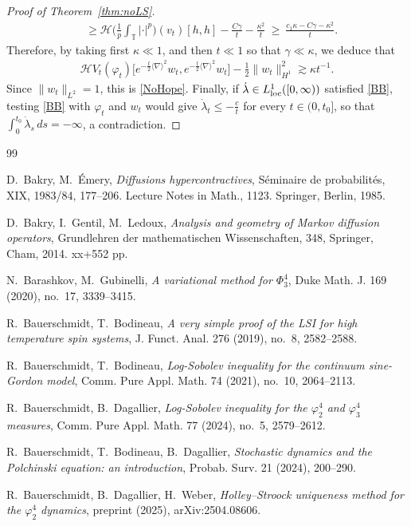 \documentclass[letterpaper, 11pt,  reqno]{amsart}
\theoremstyle{definition}
\newcommand{\1}{\mathbbm 1}
\newcommand{\T}{\mathbb{T}}
\renewcommand{\H}{\mathcal H}
\newcommand{\0}{\mathbf 0}
\newcommand{\nb}{\nabla}
\newcommand{\g}{\gamma}
\newcommand{\ld}{\lambda}
\newcommand{\jb}[1]
{\langle #1 \rangle}
\newcommand{\ph}{\varphi}
\renewcommand{\H}{\mathcal{H}}
\numberwithin{equation}{section}
\numberwithin{theorem}{section}
\newcommand{\HF}[2]{\mathcal H\big(\tfrac1p{\textstyle\int_\T}|\cdot|^p\big)(#1)[#2]}
\begin{document}
\begin{proof}[Proof of Theorem~\ref{thm:noLS}]
\begin{align*}
&\ge\HF{v_t}{h,h}-\frac{C\g}t-\frac{\kappa^2}t
\ \ge\ \frac{c_1\kappa-C\g-\kappa^2}t .
\end{align*}
Therefore, by taking first $\kappa\ll1$, and then $t\ll1$ so that $\g\ll\kappa$, we deduce that
\begin{align*}
    \H V_t(\ph_t)\big[e^{-\frac t2\jb\nb^2}w_t,e^{-\frac t2\jb\nb^2}w_t\big]
- \frac12\|w_t\|_{H^1}^2 \gtrsim \kappa t^{-1}.
\end{align*}
Since $\|w_t\|_{L^2}=1$, this is \eqref{NoHope}. Finally, if $\dot\ld\in L^1_{\rm loc}([0,\infty))$ satisfied \eqref{BB},
testing \eqref{BB} with $\ph_t$ and $w_t$ would give $\dot\ld_t\le-\frac ct$ for every $t\in(0,t_0]$, so that
$\int_0^{t_0}\dot\ld_s\,ds=-\infty$, a contradiction.
\end{proof}
 
\begin{thebibliography}{99}
 
D.~Bakry, M.~\'Emery,
{\it Diffusions hypercontractives}, 
S\'eminaire de probabilit\'es, XIX, 1983/84, 177--206.
Lecture Notes in Math., 1123. Springer, Berlin, 1985.
 
D.~Bakry, I.~Gentil, M.~Ledoux, 
{\it Analysis and geometry of Markov diffusion operators}, Grundlehren der mathematischen Wissenschaften, 348, Springer, Cham, 2014. xx+552 pp.
 
N.~Barashkov, M.~Gubinelli,
{\it  A variational method for $\Phi^4_3$}, 
Duke Math. J. 169 (2020), no.~17, 3339--3415.
 
R.~Bauerschmidt, T.~Bodineau, 
{\it A very simple proof of the LSI for high temperature spin systems}, J. Funct. Anal. 
276 (2019), no.~8, 2582--2588.
 
R.~Bauerschmidt, T.~Bodineau, {\it Log-Sobolev inequality for the continuum sine-Gordon model}, Comm. Pure Appl. Math. 74 (2021), no.~10, 2064--2113.
 
 
R.~Bauerschmidt, B.~Dagallier, 
{\it Log-Sobolev inequality for the $\varphi^4_2$ and $\varphi^4_3$ measures}, Comm. Pure Appl. Math. 77 (2024), no.~5, 2579--2612.
 
 
 
R.~Bauerschmidt, T.~Bodineau, 
B.~Dagallier, 
{\it Stochastic dynamics and the Polchinski equation: an introduction}, Probab. Surv. 21 (2024), 200--290.
 
R.~Bauerschmidt, B.~Dagallier, H.~Weber, {\it Holley--Stroock uniqueness method for the $\ph^4_2$ dynamics}, preprint (2025), arXiv:2504.08606.
 

\end{thebibliography}
\end{document}

